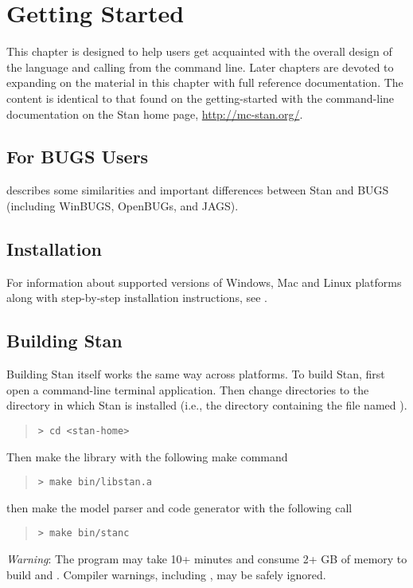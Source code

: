 \chapter{Getting Started}

\noindent
This chapter is designed to help users get acquainted with the overall
design of the \Stan language and calling \Stan from the command line.
Later chapters are devoted to expanding on the material in this
chapter with full reference documentation.  The content is identical
to that found on the getting-started with the command-line
documentation on the Stan home page, \url{http://mc-stan.org/}.

\section{For BUGS Users}

 describes some similarities
and important differences between Stan and BUGS (including WinBUGS,
OpenBUGs, and JAGS).


\section{Installation}

For information about supported versions of Windows, Mac and Linux
platforms along with step-by-step installation instructions, see
.

\section{Building Stan}

Building Stan itself works the same way across platforms.
To build Stan, first open a command-line terminal application.  Then change
directories to the directory in which Stan is installed (i.e., the
directory containing the file named ).
%
\begin{quote}
\begin{Verbatim}[fontshape=sl]
> cd <stan-home>
\end{Verbatim}
\end{quote}
%
Then make the library with the following make command
%
\begin{quote}
\begin{Verbatim}[fontshape=sl]
> make bin/libstan.a
\end{Verbatim}
\end{quote}
%
then make the model parser and code generator with the following call
%
\begin{quote}
\begin{Verbatim}[fontshape=sl]
> make bin/stanc
\end{Verbatim}
\end{quote}
%
\emph{Warning}: The  program may take 10+ minutes and
consume 2+ GB of memory to build  and .
Compiler warnings, including , may be safely ignored.
 
